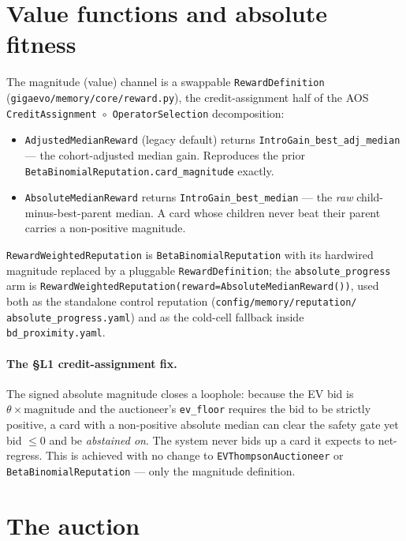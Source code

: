 \documentclass[11pt]{article}
\newcommand{\code}[1]{\texttt{#1}}
\begin{document}
\section{Value functions and absolute fitness}
\label{sec:value}

The magnitude (value) channel is a swappable \code{RewardDefinition}
(\code{gigaevo/memory/core/reward.py}), the credit-assignment half of the AOS
\code{CreditAssignment $\circ$ OperatorSelection} decomposition:

\begin{itemize}[leftmargin=2em,itemsep=1pt]
\item \code{AdjustedMedianReward} (legacy default) returns
\code{IntroGain\_best\_adj\_median} --- the cohort-adjusted median gain. Reproduces
the prior \code{BetaBinomialReputation.card\_magnitude} exactly.
\item \code{AbsoluteMedianReward} returns \code{IntroGain\_best\_median} --- the
\emph{raw} child-minus-best-parent median. A card whose children never beat their
parent carries a non-positive magnitude.
\end{itemize}

\code{RewardWeightedReputation} is \code{BetaBinomialReputation} with its hardwired
magnitude replaced by a pluggable \code{RewardDefinition}; the
\code{absolute\_progress} arm is
\code{RewardWeightedReputation(reward=AbsoluteMedianReward())}, used both as the
standalone control reputation (\code{config/memory/reputation/
absolute\_progress.yaml}) and as the cold-cell fallback inside
\code{bd\_proximity.yaml}.

\paragraph{The \S L1 credit-assignment fix.} The signed absolute magnitude closes
a loophole: because the EV bid is $\theta\!\times\!\text{magnitude}$ and the
auctioneer's \code{ev\_floor} requires the bid to be strictly positive, a card with
a non-positive absolute median can clear the safety gate yet bid $\le 0$ and be
\emph{abstained on}. The system never bids up a card it expects to net-regress.
This is achieved with no change to \code{EVThompsonAuctioneer} or
\code{BetaBinomialReputation} --- only the magnitude definition.

\section{The auction}
\end{document}

